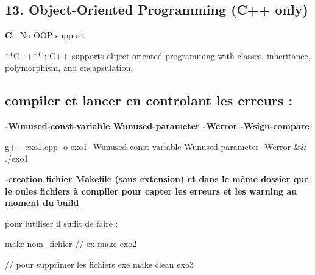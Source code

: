 \subsection*{13. Object-\/\+Oriented Programming (C++ only)}


\begin{DoxyItemize}
\item {\bfseries C} \+: No O\+OP support
\item $\ast$$\ast$\+C++$\ast$$\ast$ \+: C++ supports object-\/oriented programming with classes, inheritance, polymorphism, and encapsulation.
\end{DoxyItemize}

\subsection*{compiler et lancer en controlant les erreurs \+:}


\begin{DoxyItemize}
\item {\bfseries -\/\+Wunused-\/const-\/variable Wunused-\/parameter -\/\+Werror -\/\+Wsign-\/compare} 
\begin{DoxyCode}
g++ exo1.cpp -o exo1 -Wunused-\textcolor{keyword}{const}-variable Wunused-parameter -Werror && ./exo1
\end{DoxyCode}

\item {\bfseries -\/creation fichier Makefile (sans extension) et dans le même dossier que le oules fichiers à compiler pour capter les erreurs et les warning au moment du build} 
 pour l\textquotesingle{}utiliser il suffit de faire \+: 
\begin{DoxyCode}
make \hyperlink{namespaceload__all__file__url__return__df_a5a32746777f32baf5f824a720b64a1a7}{nom\_fichier}
\textcolor{comment}{// ex}
make exo2

\textcolor{comment}{//  pour supprimer les fichiers exe}
make clean exo3
\end{DoxyCode}

\end{DoxyItemize}

